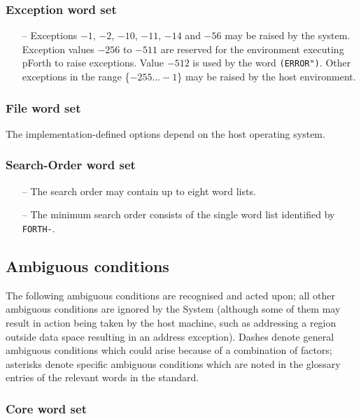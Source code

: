 \documentclass[english]{article}
\begin{document}
\subsubsection{Exception word set}

\begin{itemize}
\item[--]Exceptions $-1$, $-2$, $-10$, $-11$, $-14$ and $-56$ may be raised by the system. Exception values $-256$ to $-511$ are reserved for the environment executing pForth to raise exceptions. Value $-512$ is used by the word {\tt (ERROR")}. Other exceptions in the range \{$-255\dots -1$\} may be raised by the host environment.
\end{itemize}

\subsubsection{File word set}

The implementation-defined options depend on the host operating system.

\subsubsection{Search-Order word set}

\begin{itemize}
\item[--]The search order may contain up to eight word lists.
\item[--]The minimum search order consists of the single word list identified
by {\tt FORTH-}.
\end{itemize}


\subsection{Ambiguous conditions}

The following ambiguous conditions are recognised and acted upon; all other
ambiguous conditions are ignored by the System (although some of them may
result in action being taken by the host machine, such as addressing a region
outside data space resulting in an address exception). Dashes denote general
ambiguous conditions which could arise because of a combination of factors;
asterisks denote specific ambiguous conditions which are noted in the
glossary entries of the relevant words in the standard.

\subsubsection{Core word set}
\end{document}
